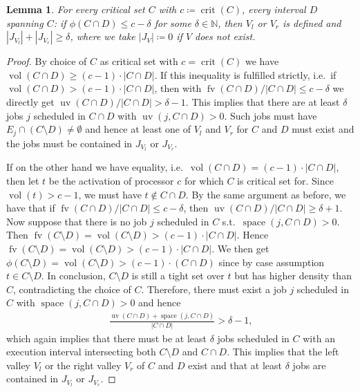 \documentclass[a4paper]{article}
\DeclareMathOperator{\fv}{fv}
\DeclareMathOperator{\uv}{uv}
\DeclareMathOperator{\vol}{vol}
\DeclareMathOperator{\crit}{crit}
\DeclareMathOperator{\spac}{space}
\newtheorem{lemma}[theorem]{Lemma}
\begin{document}
\begin{lemma}\label{lemma:valley}
  For every critical set $C$ with $c \coloneqq \crit(C)$, every interval $D$ spanning $C$:
  if $\phi(C \cap D) \leq c - \delta$ for some $\delta \in \mathbb{N}$, then $V_l$ or $V_r$ is defined and $|J_{V_l}| + |J_{V_r}| \geq \delta$, where we take $|J_V| \coloneqq 0$ if $V$ does not exist.
\end{lemma}
\begin{proof}
  By choice of $C$ as critical set with $c = \crit(C)$ we have $\vol(C \cap D) \geq (c-1) \cdot |C \cap D|$.
  If this inequality is fulfilled strictly, i.e.\ if
  $\vol(C \cap D) > (c-1) \cdot |C \cap D|$, then with
  $\fv(C \cap D) / |C \cap D| \leq c - \delta$ we directly get $\uv(C \cap D) / |C \cap D| > \delta - 1$.
  This implies that there are at least $\delta$ jobs $j$ scheduled in $C \cap D$ with $\uv(j, C \cap D) > 0$.
  Such jobs must have $E_j \cap (C \setminus D) \neq \emptyset$ and hence at least one of $V_l$ and $V_r$ for $C$ and $D$ must exist and the jobs must be contained in $J_{V_l}$ or $J_{V_r}$.

  If on the other hand we have equality, i.e.\ $\vol(C \cap D) = (c-1) \cdot |C \cap D|$, then let $t$ be the activation of processor $c$ for which $C$ is critical set for.
  Since $\vol(t) > c-1$, we must have $t \notin C \cap D$.
  By the same argument as before, we have that if $\fv(C \cap D) / |C \cap D| \leq c - \delta$, then $\uv(C \cap D) / |C \cap D| \geq \delta + 1$.
  Now suppose that there is no job $j$ scheduled in $C$ s.t.\ $\spac(j, C \cap D) > 0$.
  Then $\fv(C \setminus D) = \vol(C \setminus D) > (c-1) \cdot | C \cap D|$.
  Hence $\fv(C \setminus D) = \vol(C \setminus D) > (c - 1) \cdot |C \cap D|$.
  We then get $\phi(C \setminus D) = \vol(C \setminus D) > (c-1) \cdot (C \cap D)$ since by case assumption $t \in C \setminus D$.
  In conclusion, $C \setminus D$ is still a tight set over $t$ but has higher density than $C$, contradicting the choice of $C$.
  Therefore, there must exist a job $j$ scheduled in $C$ with $\spac(j, C \cap D) > 0$ and hence
  \begin{align}
    \frac
    {\uv(C \cap D) + \spac(j, C \cap D)}
    {|C \cap D|}
    > \delta - 1 \text{,}
  \end{align}
  which again implies that there must be at least $\delta$ jobs scheduled in $C$ with an execution interval intersecting both $C \setminus D$ and $C \cap D$.
  This implies that the left valley $V_l$ or the right valley $V_r$ of $C$ and $D$ exist and that at least $\delta$ jobs are contained in $J_{V_l}$ or $J_{V_r}$.
\end{proof}
\end{document}
